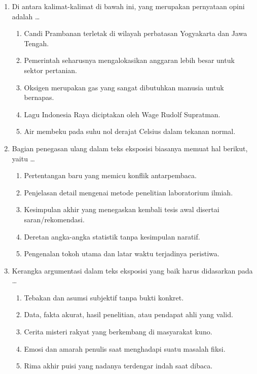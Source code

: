 \documentclass[12pt,a4paper]{article}
\begin{document}
\begin{enumerate}[leftmargin=*]
\item Di antara kalimat-kalimat di bawah ini, yang merupakan pernyataan opini adalah \dots
    \begin{enumerate}[label=\alph*.]
        \item Candi Prambanan terletak di wilayah perbatasan Yogyakarta dan Jawa Tengah.
        \item Pemerintah seharusnya mengalokasikan anggaran lebih besar untuk sektor pertanian.
        \item Oksigen merupakan gas yang sangat dibutuhkan manusia untuk bernapas.
        \item Lagu Indonesia Raya diciptakan oleh Wage Rudolf Supratman.
        \item Air membeku pada suhu nol derajat Celsius dalam tekanan normal.
    \end{enumerate}

\item Bagian penegasan ulang dalam teks eksposisi biasanya memuat hal berikut, yaitu \dots
    \begin{enumerate}[label=\alph*.]
        \item Pertentangan baru yang memicu konflik antarpembaca.
        \item Penjelasan detail mengenai metode penelitian laboratorium ilmiah.
        \item Kesimpulan akhir yang menegaskan kembali tesis awal disertai saran/rekomendasi.
        \item Deretan angka-angka statistik tanpa kesimpulan naratif.
        \item Pengenalan tokoh utama dan latar waktu terjadinya peristiwa.
    \end{enumerate}

\item Kerangka argumentasi dalam teks eksposisi yang baik harus didasarkan pada \dots
    \begin{enumerate}[label=\alph*.]
        \item Tebakan dan asumsi subjektif tanpa bukti konkret.
        \item Data, fakta akurat, hasil penelitian, atau pendapat ahli yang valid.
        \item Cerita misteri rakyat yang berkembang di masyarakat kuno.
        \item Emosi dan amarah penulis saat menghadapi suatu masalah fiksi.
        \item Rima akhir puisi yang nadanya terdengar indah saat dibaca.
    \end{enumerate}


\end{enumerate}
\end{document}

